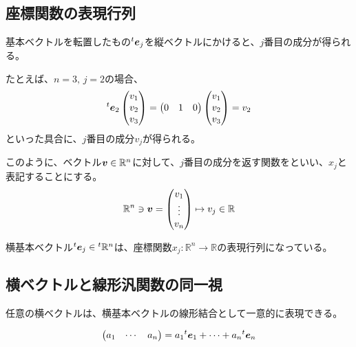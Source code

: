 \documentclass[../../../topic_linear-algebra]{subfiles}
\begin{document}
\subsection{座標関数の表現行列}

基本ベクトルを転置したもの${}^t\vb*{e}_j$を縦ベクトルにかけると、$j$番目の成分が得られる。

たとえば、$n=3,\,j=2$の場合、
\begin{equation*}
  {}^t\vb*{e}_2\begin{pmatrix}
    v_1 \\
    v_2 \\
    v_3
  \end{pmatrix} = \begin{pmatrix}
    0 & 1 & 0
  \end{pmatrix}
  \begin{pmatrix}
    v_1 \\
    v_2 \\
    v_3
  \end{pmatrix}
  = v_2
\end{equation*}
といった具合に、$j$番目の成分$v_j$が得られる。

\br

このように、ベクトル$\vb*{v} \in \mathbb{R}^n$に対して、$j$番目の成分を返す関数をといい、$x_j$と表記することにする。
\begin{equation*}
  \mathbb{R}^n \ni \vb*{v} = \begin{pmatrix}
    v_1 \\
    \vdots \\
    v_n
  \end{pmatrix} \mapsto v_j \in \mathbb{R}
\end{equation*}

横基本ベクトル${}^t\vb*{e}_j \in {}^t\mathbb{R}^n$は、座標関数$x_j\colon \mathbb{R}^n \to \mathbb{R}$の表現行列になっている。

\subsection{横ベクトルと線形汎関数の同一視}\label{sec:row-vector-functional}

任意の横ベクトルは、横基本ベクトルの線形結合として一意的に表現できる。

\begin{equation*}
  \begin{pmatrix}
    a_1 & \cdots & a_n
  \end{pmatrix}
  = a_1 {}^t\vb*{e}_1 + \cdots + a_n {}^t\vb*{e}_n
\end{equation*}
\end{document}

